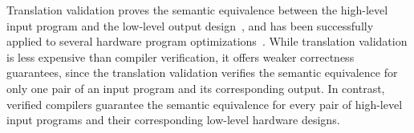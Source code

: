 Translation validation proves the semantic equivalence between
the high-level input program and the low-level output design~\cite{PnueliSS98,Necula00},
and has been successfully applied
to several hardware program optimizations~\cite{KimKM04,KarfaMSPR06,BanerjeeKSM14,ChoukseyKB19,ChoukseyK20}.
While translation validation is less expensive than compiler verification, it offers weaker correctness guarantees, since the translation validation verifies the semantic equivalence for only one pair of an input program and its corresponding output.  %
In contrast, verified compilers guarantee the semantic equivalence for every pair of high-level input programs and their corresponding low-level hardware designs.











